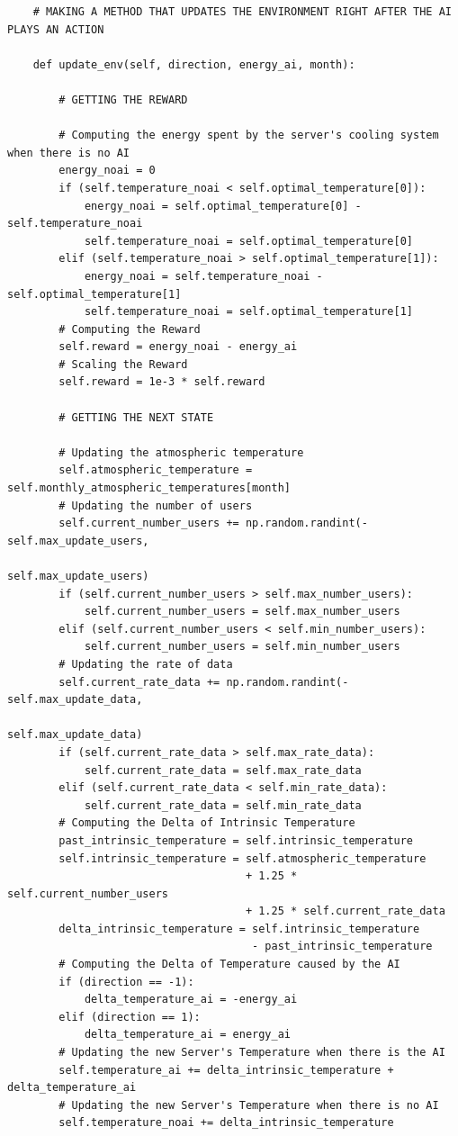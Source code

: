 \documentclass[]{book}
\begin{document}
\begin{lstlisting}
    # MAKING A METHOD THAT UPDATES THE ENVIRONMENT RIGHT AFTER THE AI PLAYS AN ACTION
    
    def update_env(self, direction, energy_ai, month):
        
        # GETTING THE REWARD
        
        # Computing the energy spent by the server's cooling system when there is no AI
        energy_noai = 0
        if (self.temperature_noai < self.optimal_temperature[0]):
            energy_noai = self.optimal_temperature[0] - self.temperature_noai
            self.temperature_noai = self.optimal_temperature[0]
        elif (self.temperature_noai > self.optimal_temperature[1]):
            energy_noai = self.temperature_noai - self.optimal_temperature[1]
            self.temperature_noai = self.optimal_temperature[1]
        # Computing the Reward
        self.reward = energy_noai - energy_ai
        # Scaling the Reward
        self.reward = 1e-3 * self.reward
        
        # GETTING THE NEXT STATE
        
        # Updating the atmospheric temperature
        self.atmospheric_temperature = self.monthly_atmospheric_temperatures[month]
        # Updating the number of users
        self.current_number_users += np.random.randint(-self.max_update_users,
                                                       self.max_update_users)
        if (self.current_number_users > self.max_number_users):
            self.current_number_users = self.max_number_users
        elif (self.current_number_users < self.min_number_users):
            self.current_number_users = self.min_number_users
        # Updating the rate of data
        self.current_rate_data += np.random.randint(-self.max_update_data,
                                                    self.max_update_data)
        if (self.current_rate_data > self.max_rate_data):
            self.current_rate_data = self.max_rate_data
        elif (self.current_rate_data < self.min_rate_data):
            self.current_rate_data = self.min_rate_data
        # Computing the Delta of Intrinsic Temperature
        past_intrinsic_temperature = self.intrinsic_temperature
        self.intrinsic_temperature = self.atmospheric_temperature
                                     + 1.25 * self.current_number_users
                                     + 1.25 * self.current_rate_data
        delta_intrinsic_temperature = self.intrinsic_temperature
                                      - past_intrinsic_temperature
        # Computing the Delta of Temperature caused by the AI
        if (direction == -1):
            delta_temperature_ai = -energy_ai
        elif (direction == 1):
            delta_temperature_ai = energy_ai
        # Updating the new Server's Temperature when there is the AI
        self.temperature_ai += delta_intrinsic_temperature + delta_temperature_ai
        # Updating the new Server's Temperature when there is no AI
        self.temperature_noai += delta_intrinsic_temperature
        

\end{lstlisting}
\end{document}
